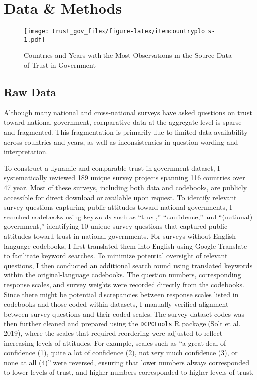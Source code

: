 \documentclass[
  12pt,
]{article}
\begin{document}
\section{Data \& Methods}\label{data-methods}

\begin{figure}
\centering
\texttt{[image: trust\_gov\_files/figure-latex/itemcountryplots-1.pdf]}
\caption{\label{fig:itemcountryplots}Countries and Years with the Most Observations in the Source Data of Trust in Government \label{tgov_item_country_plots}}
\end{figure}

\subsection{Raw Data}\label{raw-data}

Although many national and cross-national surveys have asked questions on trust toward national government, comparative data at the aggregate level is sparse and fragmented.
This fragmentation is primarily due to limited data availability across countries and years, as well as inconsistencies in question wording and interpretation.

To construct a dynamic and comparable trust in government dataset, I systematically reviewed 189 unique survey projects spanning 116 countries over 47 year.
Most of these surveys, including both data and codebooks, are publicly accessible for direct download or available upon request.
To identify relevant survey questions capturing public attitudes toward national governments, I searched codebooks using keywords such as ``trust,'' ``confidence,'' and ``(national) government,'' identifying 10 unique survey questions that captured public attitudes toward trust in national governments.
For surveys without English-language codebooks, I first translated them into English using Google Translate to facilitate keyword searches.
To minimize potential oversight of relevant questions, I then conducted an additional search round using translated keywords within the original-language codebooks.
The question numbers, corresponding response scales, and survey weights were recorded directly from the codebooks.
Since there might be potential discrepancies between response scales listed in codebooks and those coded within datasets, I manually verified alignment between survey questions and their coded scales.
The survey dataset codes was then further cleaned and prepared using the \texttt{DCPOtools} R package (Solt et al. 2019), where the scales that required reordering were adjusted to reflect increasing levels of attitudes.
For example, scales such as ``a great deal of confidence (1), quite a lot of confidence (2), not very much confidence (3), or none at all (4)'' were reversed, ensuring that lower numbers always corresponded to lower levels of trust, and higher numbers corresponded to higher levels of trust.
\end{document}
